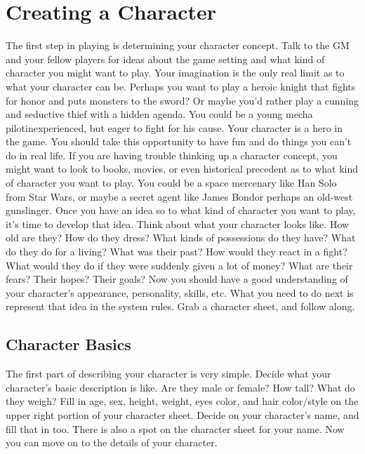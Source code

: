 \documentclass[twoside]{book}
\begin{document}
\section{Creating a Character}
     The first step in playing \APATHY{}  is determining
            your character concept. Talk to the GM and your fellow
            players for ideas about the game setting and what kind of
            character you might want to play. Your imagination is the
            only real limit as to what your character can be. Perhaps you
            want to play a heroic knight that fights for honor and puts
            monsters to the sword? Or maybe you'd rather play a
            cunning and seductive thief with a hidden agenda. You could
            be a young mecha pilotinexperienced, but eager to
            fight for his cause. Your character is a hero in the game.
            You should take this opportunity to have fun and do things
            you can't do in real life.
           If you are having trouble thinking up a character
             concept, you might want to look to books, movies, or even
             historical precedent as to what kind of character you want
             to play. You could be a space mercenary like Han Solo from
             Star Wars, or maybe a secret agent like James Bondor
             perhaps an old-west gunslinger.  Once you have an idea so to what kind of character you
             want to play, it's time to develop that idea. Think
             about what your character looks like. How old are they? How
             do they dress? What kinds of possessions do they have? What
             do they do for a living? What was their past? How would they
             react in a fight? What would they do if they were suddenly
             given a lot of money? What are their fears? Their hopes?
             Their goals?  Now you should have a good understanding of your
            character's appearance, personality, skills, etc. What
            you need to do next is represent that idea in the \APATHY{} 
            system rules. Grab a character sheet, and follow along.
          
    

\subsection{Character Basics}
     The first part of describing your character is very
               simple. Decide what your character's basic
               description is like. Are they male or female? How tall?
               What do they weigh? Fill in age, sex, height, weight, eyes
               color, and hair color/style on the upper right portion of
               your character sheet. Decide on your character's
               name, and fill that in too. There is also a spot on the
               character sheet for your name. Now you can move on to the
               details of your character. 
    
\end{document}

